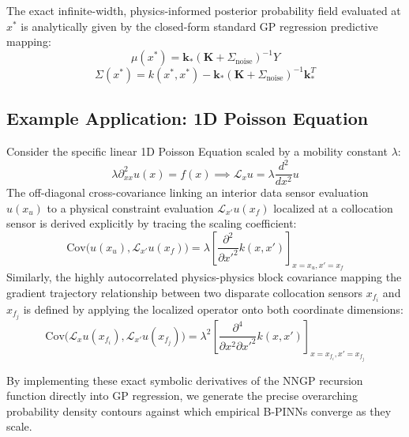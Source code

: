 \documentclass[11pt]{article}
\begin{document}
The exact infinite-width, physics-informed posterior probability field evaluated at $x^*$ is analytically given by the closed-form standard GP regression predictive mapping:
\begin{equation}
\mu(x^*) = \mathbf{k}_{*} (\mathbf{K} + \Sigma_{\text{noise}})^{-1} Y
\end{equation}
\begin{equation}
\Sigma(x^*) = k(x^*, x^*) - \mathbf{k}_{*} (\mathbf{K} + \Sigma_{\text{noise}})^{-1} \mathbf{k}_{*}^T
\end{equation}

\subsection{Example Application: 1D Poisson Equation}
Consider the specific linear 1D Poisson Equation scaled by a mobility constant $\lambda$:
\begin{equation}
\lambda \partial_{xx}^2 u(x) = f(x) \implies \mathcal{L}_x u = \lambda \frac{d^2}{dx^2} u
\end{equation}
The off-diagonal cross-covariance linking an interior data sensor evaluation $u(x_u)$ to a physical constraint evaluation $\mathcal{L}_{x'} u(x_f)$ localized at a collocation sensor is derived explicitly by tracing the scaling coefficient:
\begin{equation}
\text{Cov}\big(u(x_u), \mathcal{L}_{x'} u(x_f)\big) = \lambda \left[ \frac{\partial^2}{\partial x'^2} k(x, x') \right]_{x=x_u, x'=x_f}
\end{equation}
Similarly, the highly autocorrelated physics-physics block covariance mapping the gradient trajectory relationship between two disparate collocation sensors $x_{f_i}$ and $x_{f_j}$ is defined by applying the localized operator onto both coordinate dimensions:
\begin{equation}
\text{Cov}\big(\mathcal{L}_x u(x_{f_i}), \mathcal{L}_{x'} u(x_{f_j})\big) = \lambda^2 \left[ \frac{\partial^4}{\partial x^2 \partial x'^2} k(x, x') \right]_{x=x_{f_i}, x'=x_{f_j}}
\end{equation}

By implementing these exact symbolic derivatives of the NNGP recursion function directly into GP regression, we generate the precise overarching probability density contours against which empirical B-PINNs converge as they scale.
\end{document}
